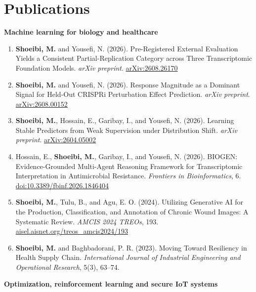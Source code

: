 \documentclass[10pt,letterpaper]{article}
\newcommand{\me}{\textbf{Shoeibi, M.}}
\begin{document}
\section{Publications}
\begingroup\small
\textbf{Machine learning for biology and healthcare}
\begin{enumerate}
  \item \me{} and Yousefi, N. (2026). Pre-Registered External Evaluation Yields a Consistent Partial-Replication Category across Three Transcriptomic Foundation Models. \emph{arXiv preprint}. \href{https://arxiv.org/abs/2608.26170}{arXiv:2608.26170}
  \item \me{} and Yousefi, N. (2026). Response Magnitude as a Dominant Signal for Held-Out CRISPRi Perturbation Effect Prediction. \emph{arXiv preprint}. \href{https://arxiv.org/abs/2608.00152}{arXiv:2608.00152}
  \item \me{}, Hossain, E., Garibay, I., and Yousefi, N. (2026). Learning Stable Predictors from Weak Supervision under Distribution Shift. \emph{arXiv preprint}. \href{https://arxiv.org/abs/2604.05002}{arXiv:2604.05002}
  \item Hossain, E., \me{}, Garibay, I., and Yousefi, N. (2026). BIOGEN: Evidence-Grounded Multi-Agent Reasoning Framework for Transcriptomic Interpretation in Antimicrobial Resistance. \emph{Frontiers in Bioinformatics}, 6. \href{https://doi.org/10.3389/fbinf.2026.1846404}{doi:10.3389/fbinf.2026.1846404}
  \item \me{}, Tulu, B., and Agu, E. O. (2024). Utilizing Generative AI for the Production, Classification, and Annotation of Chronic Wound Images: A Systematic Review. \emph{AMCIS 2024 TREOs}, 193. \href{https://aisel.aisnet.org/treos_amcis2024/193/}{aisel.aisnet.org/treos\_amcis2024/193}
  \item \me{} and Baghbadorani, P. R. (2023). Moving Toward Resiliency in Health Supply Chain. \emph{International Journal of Industrial Engineering and Operational Research}, 5(3), 63--74.
\end{enumerate}
\textbf{Optimization, reinforcement learning and secure IoT systems}
\end{document}
